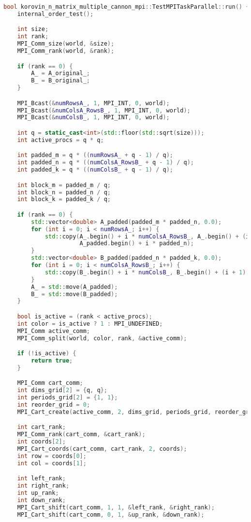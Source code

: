 \documentclass[12pt]{article}
\begin{document}
\begin{lstlisting}[language=C++]
bool korovin_n_matrix_multiple_cannon_mpi::TestMPITaskParallel::run() {
    internal_order_test();

    int size;
    int rank;
    MPI_Comm_size(world, &size);
    MPI_Comm_rank(world, &rank);

    if (rank == 0) {
        A_ = A_original_;
        B_ = B_original_;
    }

    MPI_Bcast(&numRowsA_, 1, MPI_INT, 0, world);
    MPI_Bcast(&numColsA_RowsB_, 1, MPI_INT, 0, world);
    MPI_Bcast(&numColsB_, 1, MPI_INT, 0, world);

    int q = static_cast<int>(std::floor(std::sqrt(size)));
    int active_procs = q * q;

    int padded_m = q * ((numRowsA_ + q - 1) / q);
    int padded_n = q * ((numColsA_RowsB_ + q - 1) / q);
    int padded_k = q * ((numColsB_ + q - 1) / q);

    int block_m = padded_m / q;
    int block_n = padded_n / q;
    int block_k = padded_k / q;

    if (rank == 0) {
        std::vector<double> A_padded(padded_m * padded_n, 0.0);
        for (int i = 0; i < numRowsA_; i++) {
            std::copy(A_.begin() + i * numColsA_RowsB_, A_.begin() + (i + 1) * numColsA_RowsB_,
                      A_padded.begin() + i * padded_n);
        }
        std::vector<double> B_padded(padded_n * padded_k, 0.0);
        for (int i = 0; i < numColsA_RowsB_; i++) {
            std::copy(B_.begin() + i * numColsB_, B_.begin() + (i + 1) * numColsB_, B_padded.begin() + i * padded_k);
        }
        A_ = std::move(A_padded);
        B_ = std::move(B_padded);
    }

    bool is_active = (rank < active_procs);
    int color = is_active ? 1 : MPI_UNDEFINED;
    MPI_Comm active_comm;
    MPI_Comm_split(world, color, rank, &active_comm);

    if (!is_active) {
        return true;
    }

    MPI_Comm cart_comm;
    int dims_grid[2] = {q, q};
    int periods_grid[2] = {1, 1};
    int reorder_grid = 0;
    MPI_Cart_create(active_comm, 2, dims_grid, periods_grid, reorder_grid, &cart_comm);

    int cart_rank;
    MPI_Comm_rank(cart_comm, &cart_rank);
    int coords[2];
    MPI_Cart_coords(cart_comm, cart_rank, 2, coords);
    int row = coords[0];
    int col = coords[1];

    int left_rank;
    int right_rank;
    int up_rank;
    int down_rank;
    MPI_Cart_shift(cart_comm, 1, 1, &left_rank, &right_rank);
    MPI_Cart_shift(cart_comm, 0, 1, &up_rank, &down_rank);


\end{lstlisting}
\end{document}
